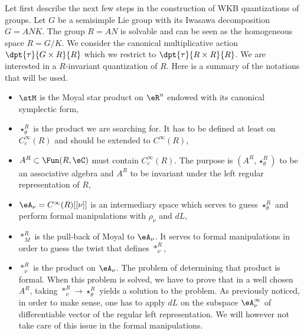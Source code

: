 Let first describe the next few steps in the construction of WKB quantizations of groups. Let $G$ be a semisimple Lie group with its Iwasawa decomposition $G=ANK$. The group $R=AN$ is solvable and can be seen as the homogeneous space $R=G/K$. We consider the canonical multiplicative action $\dpt{\tau}{G\times R}{R}$ which we restrict to $\dpt{\tau}{R\times R}{R}$. We are interested in a $R$-invariant quantization of $R$. Here is a summary of the notations that will be used.

\begin{itemize}
\item $\stM$ is the Moyal star product on $\eR^n$ endowed with its canonical symplectic form,
\item $\star^R_{\theta}$ is the product we are searching for. It has to be defined at least on $ C_c^{\infty}(R)$ and should be extended to $ C^{\infty}(R)$,
\item $A^R\subset\Fun(R,\eC)$ must contain $ C^{\infty}_c(R)$. The purpose is $(A^R,\star^R_{\theta})$ to be an associative algebra and $A^R$ to be invariant under the left regular representation of $R$,
\item $\eA_{\nu}= C^{\infty}(R)[ [\nu]]$ is an intermediary space which serves to guess $\star^R_{\theta}$ and perform formal manipulations with $\rho_{\nu}$ and $dL$,
\item $\ast_M^R$ is the pull-back of Moyal to $\eA_{\nu}$. It serves to formal manipulations in order to guess the twist that defines $\ast^R_{\nu}$,
\item $\ast^R_{\nu}$ is the product on $\eA_{\nu}$. The problem of determining that product is formal. When this problem is solved, we have to prove that in a well chosen $A^R$, taking $\ast_{\nu}^R\to\star^R_{\theta}$ yields a solution to the problem. As previously noticed, in order to make sense, one has to apply $dL$ on the subspace $\eA_{\nu}^{\infty}$ of differentiable vector of the regular left representation. We will however not take care of this issue in the formal manipulations.
\end{itemize}


